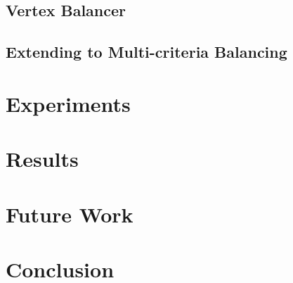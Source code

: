\documentclass[a4paper]{article}
\begin{document}
\subsection{Vertex Balancer}

\subsection{Extending to Multi-criteria Balancing}
\section{Experiments}

\section{Results}

\section{Future Work}

\section{Conclusion}


\newpage 

%
\end{document}
